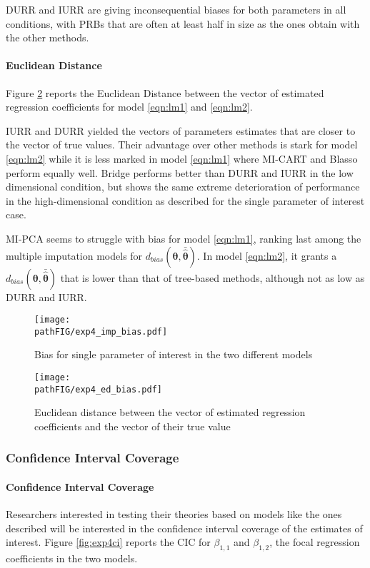 	DURR and IURR are giving inconsequential biases for both parameters in all conditions, with PRBs that are
	often at least half in size as the ones obtain with the other methods.

	\paragraph{Euclidean Distance}
	Figure \ref{fig:exp4biased} reports the Euclidean Distance between the vector of estimated regression 
	coefficients for model \ref{eqn:lm1} and \ref{eqn:lm2}.

	IURR and DURR yielded the vectors of parameters estimates that are closer to the vector of true values.
	Their advantage over other methods is stark for model \ref{eqn:lm2} while it is less marked 
	in model \ref{eqn:lm1} where MI-CART and Blasso perform equally well. 
	Bridge performs better than DURR and IURR in the low dimensional condition, but shows the same extreme 
	deterioration of performance in the high-dimensional condition as described for the single parameter of 
	interest case.

	MI-PCA seems to struggle with bias for model \ref{eqn:lm1}, ranking last among the multiple imputation models for
	$d_{bias}(\bm{\theta},\bar{\hat{\bm{\theta}}})$.
	In model \ref{eqn:lm2}, it grants a $d_{bias}(\bm{\theta},\bar{\hat{\bm{\theta}}})$ that is lower than that of 
	tree-based methods, although not as low as DURR and IURR.

\begin{figure}
	\centering
	\texttt{[image: \\pathFIG/exp4\_imp\_bias.pdf]}
	\caption{Bias for single parameter of interest in the two different models}
	\label{fig:exp4bias}
\end{figure}

\begin{figure}
	\centering
	\texttt{[image: \\pathFIG/exp4\_ed\_bias.pdf]}
	\caption{Euclidean distance between the vector of estimated regression coefficients and
		the vector of their true value}
	\label{fig:exp4biased}
\end{figure}


\subsubsection{Confidence Interval Coverage}

	\paragraph{Confidence Interval Coverage}
	Researchers interested in testing their theories based on models like the ones described will be interested
	in the confidence interval coverage of the estimates of interest.
	Figure \ref{fig:exp4ci} reports the CIC for $\beta_{1,1}$ and $\beta_{1,2}$, the focal regression coefficients 
	in the two models.

